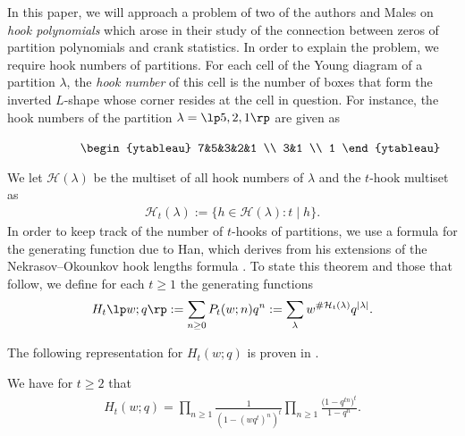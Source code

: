 In this paper, we will approach a problem of two of the authors and Males \cite{FMR} on {\it hook polynomials} which arose in their study of the connection between zeros of partition polynomials and crank statistics. In order to explain the problem, we require hook numbers of partitions. For each cell of the Young diagram of a partition $\lambda$, the {\it hook number} of this cell is the number of boxes that form the inverted $L$-shape whose corner resides at the cell in question. For instance, the hook numbers of the partition $\lambda = \lp 5, 2, 1 \rp$ are given as
\begin{figure}[ht] ${\hspace{0.4in} \begin{ytableau} 7&5&3&2&1 \\ 3&1 \\ 1 \end{ytableau}}$
\end{figure}

 We let $\mathcal H(\lambda)$ be the multiset of all hook numbers of $\lambda$ and the $t$-hook multiset as
\begin{align*}
 \mathcal H_t(\lambda) := \{ h \in \mathcal H(\lambda) : t \mid h \}.
\end{align*}
In order to keep track of the number of $t$-hooks of partitions, we use a formula for the generating function due to Han, which derives from his extensions of the Nekrasov--Okounkov hook lengths formula \cite{Han,NekOk}. To state this theorem and those that follow, we define for each $t \geq 1$ the generating functions
\begin{align*}
 H_t\lp w;q \rp := \sum_{n \geq 0} P_t(w;n) q^n := \sum_{\lambda} w^{\#\mathcal H_t(\lambda)} q^{|\lambda|} .
\end{align*}

The following representation for $H_t(w;q)$ is proven in \cite[Corollary 5.1]{Han}.

\begin{Theorem}
 We have for $t \geq 2$ that
 \begin{align*}
 H_t(w;q) = \prod_{n \geq 1} \frac{1}{(1-(wq^t)^n)^t}\prod_{n \geq 1} \frac{\big(1-q^{tn}\big)^t}{1-q^n}.
 \end{align*}
\end{Theorem}
